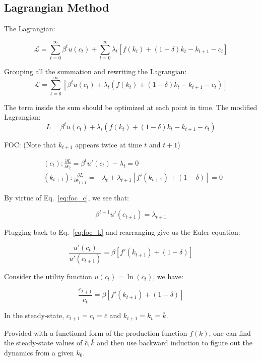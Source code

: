 \documentclass[11pt,a4paper]{book}
\theoremstyle{definition}\newtheorem{definition}{Definition}
\theoremstyle{definition}\newtheorem{fact}{Fact}
\theoremstyle{definition}\newtheorem{remark}{Remark}
\theoremstyle{definition}\newtheorem{ex}{Ex.}
\theoremstyle{definition}\newtheorem{project}{Project}
\theoremstyle{definition}\newtheorem{problem}{Problem}
\theoremstyle{definition}\newtheorem{example}{Example}
\numberwithin{theorem}{section}
\numberwithin{corollary}{chapter}
\numberwithin{assumption}{chapter}
\numberwithin{definition}{chapter}
\numberwithin{prop}{chapter}
\numberwithin{notation}{chapter}
\numberwithin{problem}{chapter}
\numberwithin{example}{chapter}
\numberwithin{fact}{chapter}
\numberwithin{ex}{chapter}
\begin{document}
	\subsection{Lagrangian Method}
	The Lagrangian:

$$
    \mathcal{L} = \sum_{t=0}^{\infty} \beta^t u(c_t) + \sum_{t=0}^{\infty} \lambda_t \left[ f(k_t) + (1- \delta) k_t - k_{t+1} - c_t \right]
$$

Grouping all the summation and rewriting the Lagrangian:
$$
    \mathcal{L} = \sum_{t=0}^{\infty} \left[ \beta^t u(c_t) + \lambda_t \left( f(k_t) + (1- \delta)k_t - k_{t+1} - c_t \right) \right]
$$

The term inside the sum should be optimized at each point in time. The modified Lagrangian:
$$
    L = \beta^t u(c_t) + \lambda_t \left( f(k_t) + (1- \delta) k_t - k_{t+1} - c_t \right)
$$

FOC: (Note that $k_{t+1}$ appears twice at time $t$ and $t+1$)

\begin{align}
      &(c_t): \frac{\partial L}{\partial c_t} = \beta^t u'(c_t) - \lambda_t = 0  \label{eq:foc_c}  \ \                                                \\
      &(k_{t+1}): \frac{\partial L}{\partial k_{t+1}} = -\lambda_t + \lambda_{t+1} \left[ f'(k_{t+1}) + (1-\delta) \right] = 0 \label{eq:foc_k} \ 
\end{align}

By virtue of Eq.~\eqref{eq:foc_c}, we see that:

$$
    \beta^{t+1}u'(c_{t+1}) = \lambda_{t+1}
$$

Plugging back to Eq.~\eqref{eq:foc_k} and rearranging give us the Euler equation:

$$
    \frac{u'(c_t)}{u'(c_{t+1})} = \beta \left[ f'(k_{t+1}) + (1-\delta) \right]
$$

Consider the utility function $u(c_t) = \ln(c_t)$, we have:

$$
    \frac{c_{t+1}}{c_t} = \beta \left[f'(k_{t+1}) + (1-\delta)\right]
$$

In the steady-state, $c_{t+1} = c_t = \bar{c}$ and $k_{t+1} = k_t = \bar{k}$.  

Provided with a functional form of the production function $f(k)$, one can find the steady-state values of $\bar{c}, \bar{k}$ and then use backward induction to figure out the dynamics from a given $k_0$.
	
\end{document}
